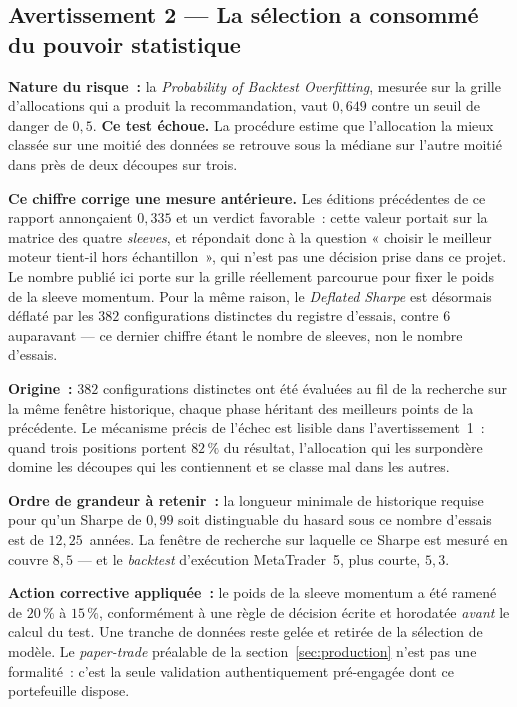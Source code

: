 \subsection{Avertissement 2 --- La sélection a consommé du pouvoir statistique}

\begin{warningbox}
\textbf{Nature du risque~:} la \textit{Probability of Backtest Overfitting}, mesurée sur la grille d'allocations qui a produit la recommandation, vaut $0{,}649$ contre un seuil de danger de $0{,}5$. \textbf{Ce test échoue.} La procédure estime que l'allocation la mieux classée sur une moitié des données se retrouve sous la médiane sur l'autre moitié dans près de deux découpes sur trois.

\textbf{Ce chiffre corrige une mesure antérieure.} Les éditions précédentes de ce rapport annonçaient $0{,}335$ et un verdict favorable~: cette valeur portait sur la matrice des quatre \emph{sleeves}, et répondait donc à la question « choisir le meilleur moteur tient-il hors échantillon~», qui n'est pas une décision prise dans ce projet. Le nombre publié ici porte sur la grille réellement parcourue pour fixer le poids de la sleeve momentum. Pour la même raison, le \textit{Deflated Sharpe} est désormais déflaté par les $382$ configurations distinctes du registre d'essais, contre $6$ auparavant --- ce dernier chiffre étant le nombre de sleeves, non le nombre d'essais.

\textbf{Origine~:} $382$ configurations distinctes ont été évaluées au fil de la recherche sur la même fenêtre historique, chaque phase héritant des meilleurs points de la précédente. Le mécanisme précis de l'échec est lisible dans l'avertissement~1~: quand trois positions portent $82\,\%$ du résultat, l'allocation qui les surpondère domine les découpes qui les contiennent et se classe mal dans les autres.

\textbf{Ordre de grandeur à retenir~:} la longueur minimale de historique requise pour qu'un Sharpe de $0{,}99$ soit distinguable du hasard sous ce nombre d'essais est de $12{,}25$~années. La fenêtre de recherche sur laquelle ce Sharpe est mesuré en couvre $8{,}5$ --- et le \textit{backtest} d'exécution MetaTrader~5, plus courte, $5{,}3$.

\textbf{Action corrective appliquée~:} le poids de la sleeve momentum a été ramené de $20\,\%$ à $15\,\%$, conformément à une règle de décision écrite et horodatée \emph{avant} le calcul du test. Une tranche de données reste gelée et retirée de la sélection de modèle. Le \emph{paper-trade} préalable de la section~\ref{sec:production} n'est pas une formalité~: c'est la seule validation authentiquement pré-engagée dont ce portefeuille dispose.
\end{warningbox}

